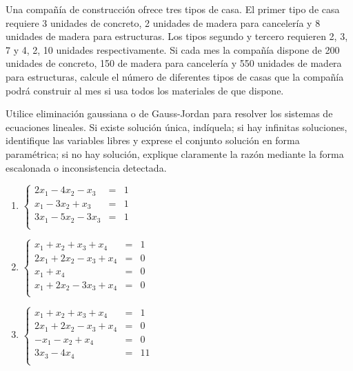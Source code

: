 \begin{prob}Una compañía de construcción ofrece tres tipos de casa. El primer tipo de casa requiere 3 unidades de concreto, 2 unidades de madera para cancelería y 8 unidades de madera para estructuras. Los tipos segundo y tercero requieren 2, 3, 7 y 4, 2, 10 unidades respectivamente. Si cada mes la compañía dispone de 200 unidades de concreto, 150 de madera para cancelería y 550 unidades de madera para estructuras, calcule el número de diferentes tipos de casas que la compañía podrá construir al mes si usa todos los materiales de que dispone.
\end{prob}



\begin{prob} Utilice eliminación gaussiana o de Gauss-Jordan para resolver los sistemas de ecuaciones lineales. Si existe solución única, indíquela; si hay infinitas soluciones, identifique las variables libres y exprese el conjunto solución en forma paramétrica; si no hay solución, explique claramente la razón mediante la forma escalonada o inconsistencia detectada.
\begin{multicols}{2}
\begin{enumerate}[$a)$]
   \item  $\left\lbrace \begin{array}{ccc}
2x_1-4x_2-x_3&=&1\\
x_1-3x_2+x_3&=&1\\
3x_1-5x_2-3x_3&=&1\\
\end{array} \right. $

	\item $\left\lbrace \begin{array}{ccc}
	x_1+x_2+x_3+x_4&=&1\\
	2x_1+2x_2-x_3+x_4&=&0\\
	x_1+x_4&=&0\\
	x_1+2x_2-3x_3+x_4&=&0\\
	\end{array} \right. $

	\item $\left\lbrace \begin{array}{ccc}
	x_1+x_2+x_3+x_4&=&1\\
	2x_1+2x_2-x_3+x_4&=&0\\
	-x_1-x_2+x_4&=&0\\
	3x_3-4x_4&=&11\\
	\end{array} \right.  $
	

\end{enumerate}
\end{multicols}
\end{prob}
